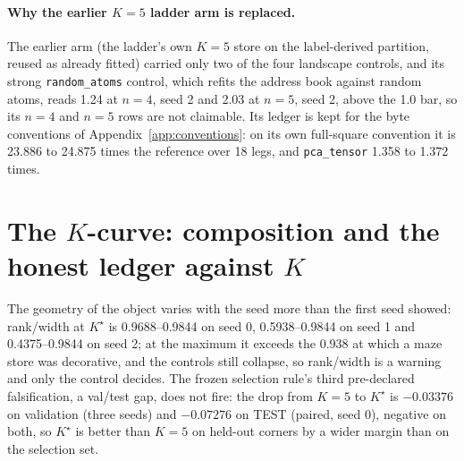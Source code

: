 \documentclass{article} %
\newcommand{\Kstar}{\ensuremath{K^{\star}}}
\begin{document}
\paragraph{Why the earlier $K=5$ ladder arm is replaced.} The earlier arm (the ladder's own
$K=5$ store on the label-derived partition, reused as already fitted) carried only two of the four
landscape controls, and its strong \texttt{random\_atoms} control, which refits the address book
against random atoms, reads 1.24 at $n=4$, seed 2 and 2.03 at $n=5$, seed 2, above the 1.0 bar, so %
its $n=4$ and $n=5$ rows are not claimable. Its ledger is kept for the byte conventions of
Appendix~\ref{app:conventions}: on its own full-square convention it is 23.886 to 24.875 times the %
reference over 18 legs, and \texttt{pca\_tensor} 1.358 to 1.372 times.
\section{The $K$-curve: composition and the honest ledger against $K$}
\label{app:kcurve}

The geometry of the object varies with the seed more than the first seed showed:
rank/width at $\Kstar$ is 0.9688--0.9844 on seed 0, 0.5938--0.9844 on seed 1 and
0.4375--0.9844 on seed 2; at the maximum it exceeds the 0.938 at which a maze store was
decorative, and the controls still collapse, so rank/width is a warning and only the control
decides. %
The frozen selection rule's third pre-declared falsification, a val/test gap, does not fire:
the drop from $K=5$ to $\Kstar$ is $-0.03376$ on validation (three seeds) and $-0.07276$ on
TEST (paired, seed 0), negative on both, so $\Kstar$ is better than $K=5$ on held-out corners
by a wider margin than on the selection set. %
\end{document}
